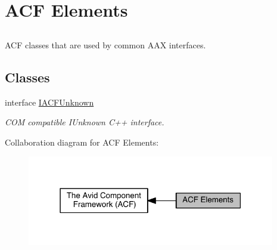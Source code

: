 \hypertarget{a00358}{}\section{A\+C\+F Elements}
\label{a00358}


\subsection{ }
A\+C\+F classes that are used by common A\+A\+X interfaces. 

\subsection*{Classes}
\begin{DoxyCompactItemize}
\item 
interface \hyperlink{a00146}{I\+A\+C\+F\+Unknown}
\begin{DoxyCompactList}\small\item\em C\+O\+M compatible I\+Unknown C++ interface. \end{DoxyCompactList}\end{DoxyCompactItemize}
Collaboration diagram for A\+C\+F Elements\+:
\nopagebreak
\begin{figure}[H]
\begin{center}
\leavevmode
\includegraphics[width=307pt]{a00358}
\end{center}
\end{figure}
